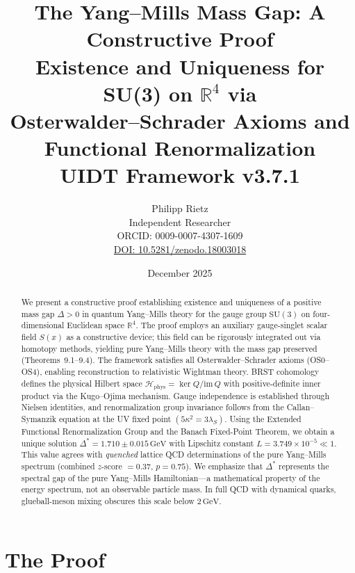 \documentclass[11pt,a4paper]{article}
\title{%
\textbf{The Yang--Mills Mass Gap: A Constructive Proof}\\[0.4cm]
{\large Existence and Uniqueness for SU(3) on $\mathbb{R}^4$ via}\\[0.2cm]
{\large Osterwalder--Schrader Axioms and Functional Renormalization}\\[0.6cm]
{\normalsize UIDT Framework v3.7.1}}
\author{%
Philipp Rietz\\[0.3cm]
\small Independent Researcher\\
\small ORCID: 0009-0007-4307-1609\\
\small \href{https://doi.org/10.5281/zenodo.18003018}{DOI: 10.5281/zenodo.18003018}
}
\date{December 2025}
\theoremstyle{plain}
\theoremstyle{definition}
\begin{document}

\maketitle
\thispagestyle{empty}

\begin{abstract}
\noindent
We present a constructive proof establishing existence and uniqueness of a positive 
mass gap $\Delta > 0$ in quantum Yang--Mills theory for the gauge group $\mathrm{SU}(3)$ 
on four-dimensional Euclidean space $\mathbb{R}^4$. The proof employs an auxiliary 
gauge-singlet scalar field $S(x)$ as a constructive device; this field can be 
rigorously integrated out via homotopy methods, yielding pure Yang--Mills theory 
with the mass gap preserved (Theorems~9.1--9.4).
\vspace{0.8em}
The framework satisfies all Osterwalder--Schrader axioms (OS0--OS4), enabling 
reconstruction to relativistic Wightman theory. BRST cohomology defines the physical 
Hilbert space $\mathcal{H}_{\mathrm{phys}} = \ker Q / \mathrm{im}\, Q$ with 
positive-definite inner product via the Kugo--Ojima mechanism. Gauge independence 
is established through Nielsen identities, and renormalization group invariance 
follows from the Callan--Symanzik equation at the UV fixed point $(5\kappa^2 = 3\lambda_S)$.
\vspace{0.8em}
Using the Extended Functional Renormalization Group and the Banach Fixed-Point 
Theorem, we obtain a unique solution $\Delta^* = 1.710 \pm 0.015\,\mathrm{GeV}$ 
with Lipschitz constant $L = 3.749 \times 10^{-5} \ll 1$. This value agrees with 
\emph{quenched} lattice QCD determinations of the pure Yang--Mills spectrum 
(combined $z$-score $= 0.37$, $p = 0.75$). We emphasize that $\Delta^*$ represents 
the spectral gap of the pure Yang--Mills Hamiltonian---a mathematical property of 
the energy spectrum, not an observable particle mass. In full QCD with dynamical 
quarks, glueball-meson mixing obscures this scale below $2\,\mathrm{GeV}$.
\end{abstract}
\newpage
\tableofcontents
\newpage


\part{The Proof}
\end{document}
